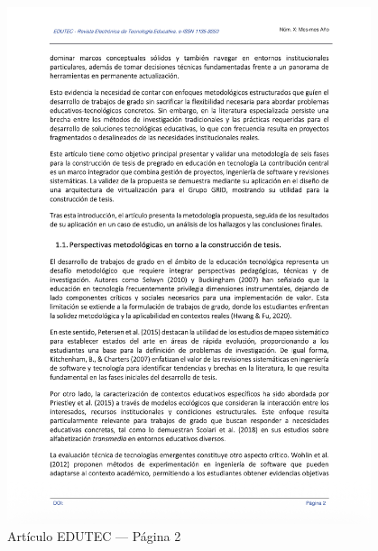 \begin{figure}[H]
    \centering
    \begin{tcolorbox}[
        colback=white,
        colframe=gray!50,
        boxrule=1pt,
        arc=2pt,
        boxsep=5pt,
        left=3pt,
        right=3pt,
        top=3pt,
        bottom=3pt,
        drop shadow
    ]
        \includegraphics[width=0.95\textwidth,keepaspectratio]{apendices/EDUTEC/2.png}
    \end{tcolorbox}
    \caption{Artículo EDUTEC --- Página 2}\label{fig:edutec-pagina-2}
\end{figure}
\FloatBarrier

